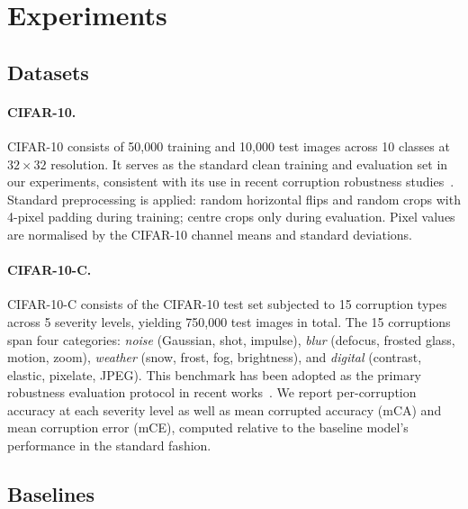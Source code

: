 \documentclass[10pt,twocolumn]{article}
\begin{document}
\section{Experiments}

\subsection{Datasets}

\paragraph{CIFAR-10.} CIFAR-10 consists of 50,000 training and 10,000 test images across 10 classes at $32 \times 32$ resolution. It serves as the standard clean training and evaluation set in our experiments, consistent with its use in recent corruption robustness studies~\cite{erichson2024noisymix,ranabhat2025shapebias,kumar2026demhec}. Standard preprocessing is applied: random horizontal flips and random crops with 4-pixel padding during training; centre crops only during evaluation. Pixel values are normalised by the CIFAR-10 channel means and standard deviations.

\paragraph{CIFAR-10-C.} CIFAR-10-C consists of the CIFAR-10 test set subjected to 15 corruption types across 5 severity levels, yielding 750,000 test images in total. The 15 corruptions span four categories: \emph{noise} (Gaussian, shot, impulse), \emph{blur} (defocus, frosted glass, motion, zoom), \emph{weather} (snow, frost, fog, brightness), and \emph{digital} (contrast, elastic, pixelate, JPEG). This benchmark has been adopted as the primary robustness evaluation protocol in recent works~\cite{ranabhat2025shapebias,kumar2026demhec,khazem2026macs}. We report per-corruption accuracy at each severity level as well as mean corrupted accuracy (mCA) and mean corruption error (mCE), computed relative to the baseline model's performance in the standard fashion.

\subsection{Baselines}
\end{document}
